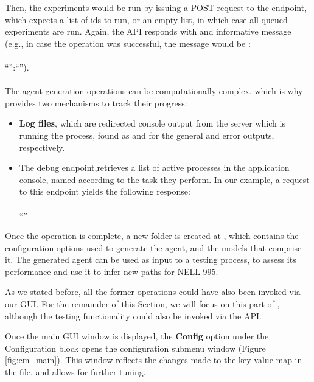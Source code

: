 Then, the experiments would be run by issuing a POST request to the  endpoint, which expects a list of ids to run, or an empty list, in  which case all queued experiments are run. Again, the API responds with and informative message (e.g., in case the operation was successful, the message would be :
\\
\\
``'':``'').
\\
\\
The agent generation operations can be computationally complex, which is why \toolname{} provides two mechanisms to track their progress:
\begin{itemize}
    \item \textbf{Log files}, which are redirected console output from the server which is running the process, found as  and  for the general and error outputs, respectively.
    
    \item The  debug endpoint,retrieves a list of active processes in the application console, named according to the task they perform. In our example, a request to this endpoint yields the following response:
    \\
    \\
    ``''

\end{itemize}

Once the operation is complete, a new folder is created at , which contains the configuration options used to generate the agent, and the models that comprise it.
The generated agent can be used as input to a testing process, to assess its performance and use it to infer new paths for NELL-995.

As we stated before, all the former operations could have also been invoked via our GUI. For the remainder of this Section, we will focus on this part of \toolname{}, although the testing functionality could also be invoked via the API.

Once the main GUI window is displayed, the \textbf{Config} option under the Configuration block opens the configuration submenu window (Figure \ref{fig:cm_main}). This window reflects the changes made to the key-value map in the  file, and allows for further tuning. 


